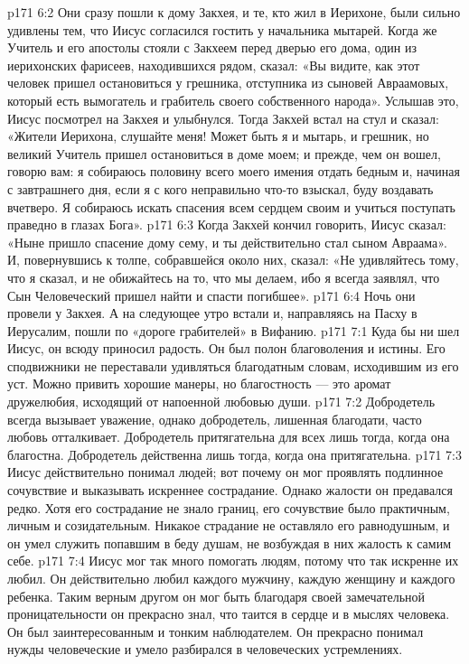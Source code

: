 \vs p171 6:2 Они сразу пошли к дому Закхея, и те, кто жил в Иерихоне, были сильно удивлены тем, что Иисус согласился гостить у начальника мытарей. Когда же Учитель и его апостолы стояли с Закхеем перед дверью его дома, один из иерихонских фарисеев, находившихся рядом, сказал: «Вы видите, как этот человек пришел остановиться у грешника, отступника из сыновей Авраамовых, который есть вымогатель и грабитель своего собственного народа». Услышав это, Иисус посмотрел на Закхея и улыбнулся. Тогда Закхей встал на стул и сказал: «Жители Иерихона, слушайте меня! Может быть я и мытарь, и грешник, но великий Учитель пришел остановиться в доме моем; и прежде, чем он вошел, говорю вам: я собираюсь половину всего моего имения отдать бедным и, начиная с завтрашнего дня, если я с кого неправильно что\hyp{}то взыскал, буду воздавать вчетверо. Я собираюсь искать спасения всем сердцем своим и учиться поступать праведно в глазах Бога».
\vs p171 6:3 Когда Закхей кончил говорить, Иисус сказал: «Ныне пришло спасение дому сему, и ты действительно стал сыном Авраама». И, повернувшись к толпе, собравшейся около них, сказал: «Не удивляйтесь тому, что я сказал, и не обижайтесь на то, что мы делаем, ибо я всегда заявлял, что Сын Человеческий пришел найти и спасти погибшее».
\vs p171 6:4 Ночь они провели у Закхея. А на следующее утро встали и, направляясь на Пасху в Иерусалим, пошли по «дороге грабителей» в Вифанию.
\vs p171 7:1 Куда бы ни шел Иисус, он всюду приносил радость. Он был полон благоволения и истины. Его сподвижники не переставали удивляться благодатным словам, исходившим из его уст. Можно привить хорошие манеры, но благостность --- это аромат дружелюбия, исходящий от напоенной любовью души.
\vs p171 7:2 Добродетель всегда вызывает уважение, однако добродетель, лишенная благодати, часто любовь отталкивает. Добродетель притягательна для всех лишь тогда, когда она благостна. Добродетель действенна лишь тогда, когда она притягательна.
\vs p171 7:3 Иисус действительно понимал людей; вот почему он мог проявлять подлинное сочувствие и выказывать искреннее сострадание. Однако жалости он предавался редко. Хотя его сострадание не знало границ, его сочувствие было практичным, личным и созидательным. Никакое страдание не оставляло его равнодушным, и он умел служить попавшим в беду душам, не возбуждая в них жалость к самим себе.
\vs p171 7:4 Иисус мог так много помогать людям, потому что так искренне их любил. Он действительно любил каждого мужчину, каждую женщину и каждого ребенка. Таким верным другом он мог быть благодаря своей замечательной проницательности он прекрасно знал, что таится в сердце и в мыслях человека. Он был заинтересованным и тонким наблюдателем. Он прекрасно понимал нужды человеческие и умело разбирался в человеческих устремлениях.
